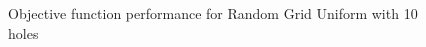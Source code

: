 \begin{figure}[H]
\begin{minipage}{.5\linewidth}
\end{minipage}%
\begin{minipage}{.5\linewidth}
\centering
{}
\end{minipage}\par\medskip

\caption{Objective function performance for Random Grid Uniform with 10 holes}
\label{fig:obj-fixed}
\end{figure}



